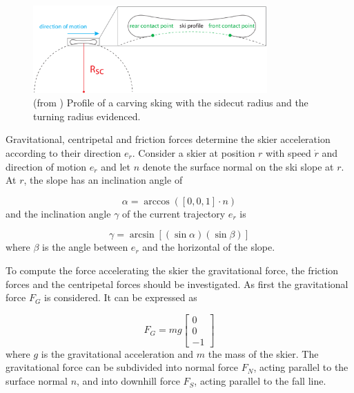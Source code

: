 \documentclass[12pt,a4paper,twoside]{book}
\begin{document}
\begin{figure}[!ht]
  \begin{center}
    \includegraphics[width=0.8\textwidth]{images/sidecut_radius.eps}
    \caption{(from \cite{hol2012}) Profile of a carving sking with the sidecut radius and the turning radius evidenced.}\label{sidecut_radius}
  \end{center}
\end{figure}

Gravitational, centripetal and friction forces determine the skier acceleration according to their direction $e_{\dot{r}}$. Consider a skier at position $r$ with speed $\dot{r}$ and direction of motion $e_{\dot{r}}$ and let $n$ denote the surface normal on the ski slope at $r$. At $r$, the slope has an inclination angle of

\begin{equation}
\alpha =\arccos(\left[0,0,1\right] \cdot n)
\end{equation}
and the inclination angle $\gamma$ of the current trajectory $e_{\dot{r}}$ is

\begin{equation}
\gamma =\arcsin[(\sin \alpha )(\sin \beta )]
\end{equation}
where $\beta$ is the angle between $e_{\dot{r}}$ and the horizontal of the slope.

To compute the force accelerating the skier the gravitational force, the friction forces and the centripetal forces should be investigated. As first the gravitational force $F_G$ is considered. It can be expressed as

\begin{equation}
F_G=mg\left[\begin{matrix}0\\0\\-1\end{matrix}\right]
\end{equation}
where $g$ is the gravitational acceleration and $m$ the mass of the skier. The gravitational force can be subdivided into normal force $F_N$, acting parallel to the surface normal $n$, and into downhill force $F_S$, acting parallel to the fall line.
\end{document}

